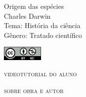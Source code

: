 \documentclass[smaller,professionalfonts,15pt]{beamer}
\begin{document}
										\begin{frame}\begin{raggedleft}
										\Huge 
Origem das espécies						\\
										\huge 
Charles Darwin							\\
										\bigskip
										\normalsize
Tema: História da ciência				\\	
Gênero: Tratado científico				\\\vfill\hfill

										\end{raggedleft}

\smallskip\hfill\includegraphics[width=2cm]{ccbync.png}
\end{frame}


\begin{frame}{\textsc{videotutorial do aluno}}
\vspace{-2cm}\begin{figure}
\hfill{}
\end{figure}
\end{frame}


\begin{frame}
\hfill\Huge
\textsc{sobre obra e autor}
\end{frame}
\end{document}
